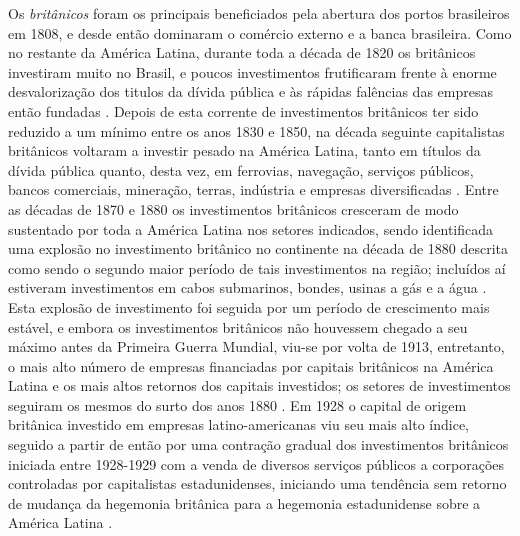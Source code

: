 Os \textit{britânicos} foram os principais beneficiados pela abertura dos portos brasileiros em 1808, e desde então dominaram o comércio externo e a banca brasileira. Como no restante da América Latina, durante toda a década de 1820 os britânicos investiram muito no Brasil, e poucos investimentos frutificaram frente à enorme desvalorização dos titulos da dívida pública e às rápidas falências das empresas então fundadas \cite{rippy_britlat_1947}. Depois de esta corrente de investimentos britânicos ter sido reduzido a um mínimo entre os anos 1830 e 1850, na década seguinte capitalistas britânicos voltaram a investir pesado na América Latina, tanto em títulos da dívida pública quanto, desta vez, em ferrovias, navegação, serviços públicos, bancos comerciais, mineração, terras, indústria e empresas diversificadas \cite{rippy_britlat_1948}. Entre as décadas de 1870 e 1880 os investimentos britânicos cresceram de modo sustentado por toda a América Latina nos setores indicados, sendo identificada uma explosão no investimento britânico no continente na década de 1880 descrita como sendo o segundo maior período de tais investimentos na região; incluídos aí estiveram investimentos em cabos submarinos, bondes, usinas a gás e a água \cite{rippy_britlat_1949}. Esta explosão de investimento foi seguida por um período de crescimento mais estável, e embora os investimentos britânicos não houvessem chegado a seu máximo antes da Primeira Guerra Mundial, viu-se por volta de 1913, entretanto, o mais alto número de empresas financiadas por capitais britânicos na América Latina e os mais altos retornos dos capitais investidos; os setores de investimentos seguiram os mesmos do surto dos anos 1880 \cite{rippy_britlat2_1947}. Em 1928 o capital de origem britânica investido em empresas latino-americanas viu seu mais alto índice, seguido a partir de então por uma contração gradual dos investimentos britânicos iniciada entre 1928-1929 com a venda de diversos serviços públicos a corporações controladas por capitalistas estadunidenses, iniciando uma tendência sem retorno de mudança da hegemonia britânica para a hegemonia estadunidense sobre a América Latina \cite{rippy_britlat_1954}.

